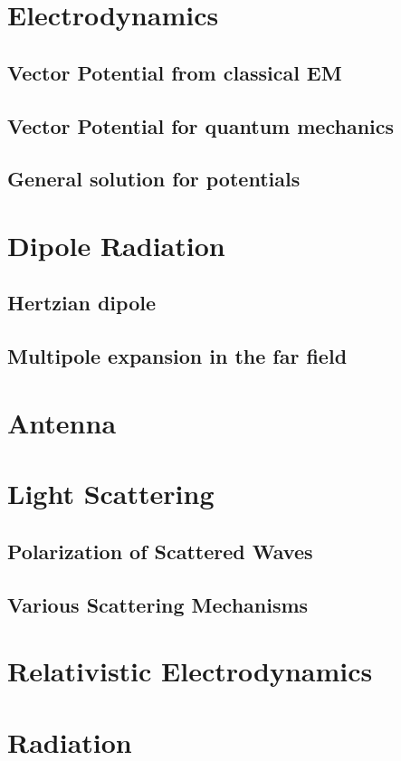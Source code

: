 \documentclass[a4paper]{article}
\theoremstyle{new}
\begin{document}
\section{Electrodynamics}
\subsection{Vector Potential from classical EM}


\newpage
\subsection{Vector Potential for quantum mechanics}

\newpage
\subsection{General solution for potentials}
\newpage
\section{Dipole Radiation}
\subsection{Hertzian dipole}

\newpage
\subsection{Multipole expansion in the far field}
\newpage
\section{Antenna}

\newpage
\section{Light Scattering}
\subsection{Polarization of Scattered Waves}
\subsection{Various Scattering Mechanisms}

\newpage
\section{Relativistic Electrodynamics}

\newpage
\section{Radiation}
\end{document}
